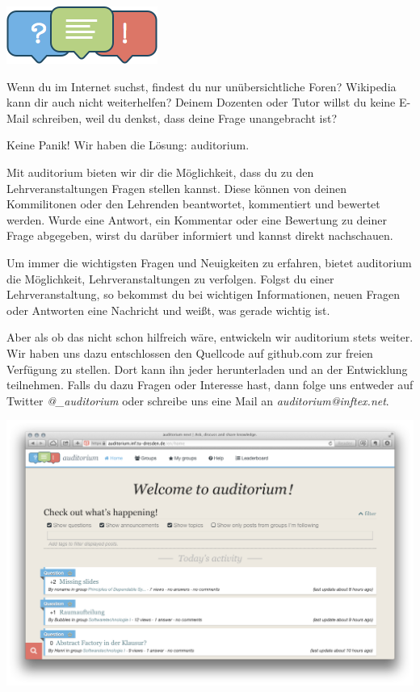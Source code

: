 
\includegraphics{img/auditorium_logo}

Wenn du im Internet suchst, findest du nur unübersichtliche Foren?
Wikipedia kann dir auch nicht weiterhelfen?
Deinem Dozenten oder Tutor willst du keine E-Mail schreiben, weil du denkst, dass deine Frage unangebracht ist?

Keine Panik!
Wir haben die Lösung: auditorium.

Mit auditorium bieten wir dir die Möglichkeit, dass du zu den Lehrveranstaltungen Fragen stellen kannst.
Diese können von deinen Kommilitonen oder den Lehrenden beantwortet, kommentiert und bewertet werden.
Wurde eine Antwort, ein Kommentar oder eine Bewertung zu deiner Frage abgegeben, wirst du darüber informiert und kannst direkt nachschauen.

Um immer die wichtigsten Fragen und Neuigkeiten zu erfahren, bietet auditorium die Möglichkeit, Lehrveranstaltungen zu verfolgen.
Folgst du einer Lehrveranstaltung, so bekommst du bei wichtigen Informationen, neuen Fragen oder Antworten eine Nachricht und weißt, was gerade wichtig ist.

Aber als ob das nicht schon hilfreich wäre, entwickeln wir auditorium stets weiter.
Wir haben uns dazu entschlossen den Quellcode auf github.com zur freien Verfügung zu stellen.
Dort kann ihn jeder herunterladen und an der Entwicklung teilnehmen.
Falls du dazu Fragen oder Interesse hast, dann folge uns entweder auf Twitter \textit{@\_auditorium} oder schreibe uns eine Mail an \textit{auditorium@inftex.net}.

\begin{center}
\includegraphics[width=.6\linewidth]{img/auditorium.png}
\end{center}